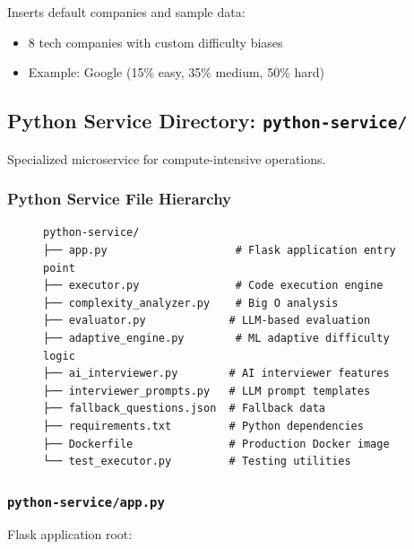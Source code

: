\documentclass[12pt,a4paper,oneside]{article}
\newcommand{\fileref}[1]{\texttt{#1}}
\begin{document}
Inserts default companies and sample data:

\begin{itemize}
    \item 8 tech companies with custom difficulty biases
    \item Example: Google (15\% easy, 35\% medium, 50\% hard)
\end{itemize}

\newpage

\subsection{Python Service Directory: \fileref{python-service/}}

Specialized microservice for compute-intensive operations.

\subsubsection{Python Service File Hierarchy}

\begin{figure}[H]
\centering
\begin{verbatim}
python-service/
├── app.py                    # Flask application entry point
├── executor.py               # Code execution engine
├── complexity_analyzer.py    # Big O analysis
├── evaluator.py             # LLM-based evaluation
├── adaptive_engine.py        # ML adaptive difficulty logic
├── ai_interviewer.py        # AI interviewer features
├── interviewer_prompts.py   # LLM prompt templates
├── fallback_questions.json  # Fallback data
├── requirements.txt         # Python dependencies
├── Dockerfile               # Production Docker image
└── test_executor.py         # Testing utilities
\end{verbatim}
\end{figure}

\subsubsection{\fileref{python-service/app.py}}

Flask application root:
\end{document}
